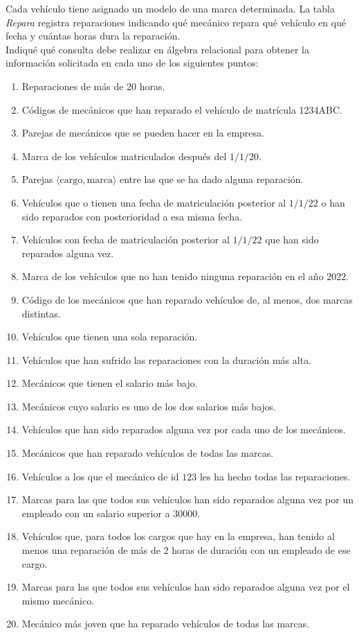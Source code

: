 \begin{ejercicio}
    Cada vehículo tiene asignado un modelo de una marca determinada. La tabla \emph{Repara} registra reparaciones indicando qué mecánico repara qué vehículo en qué fecha y cuántas horas dura la reparación.\\

    Indiqué qué consulta debe realizar en álgebra relacional para obtener la información solicitada en cada uno de los siguientes puntos:
    \begin{enumerate}
        \item Reparaciones de más de 20 horas.
        \item Códigos de mecánicos que han reparado el vehículo de matrícula 1234ABC.
        \item Parejas de mecánicos que se pueden hacer en la empresa.
        \item Marca de los vehículos matriculados después del $1/1/20$.
        \item Parejas $\langle \text{cargo}, \text{marca} \rangle$ entre las que se ha dado alguna reparación.
        \item Vehículos que o tienen una fecha de matriculación posterior al $1/1/22$ o han sido reparados con posterioridad a esa misma fecha.
        \item Vehículos con fecha de matriculación posterior al $1/1/22$ que han sido reparados alguna vez.
        \item Marca de los vehículos que no han tenido ninguna reparación en el año $2022$.
        \item Código de los mecánicos que han reparado vehículos de, al menos, dos marcas distintas.
        \item Vehículos que tienen una sola reparación.
        \item Vehículos que han sufrido las reparaciones con la duración más alta.
        \item Mecánicos que tienen el salario más bajo.
        \item Mecánicos cuyo salario es uno de los dos salarios más bajos.
        \item Vehículos que han sido reparados alguna vez por cada uno de los mecánicos.
        \item Mecánicos que han reparado vehículos de todas las marcas.
        \item Vehículos a los que el mecánico de id $123$ les ha hecho todas las reparaciones.
        \item Marcas para las que todos sus vehículos han sido reparados alguna vez por un empleado con un salario superior a $30000$.
        \item Vehículos que, para todos los cargos que hay en la empresa, han tenido al menos una reparación de más de $2$ horas de duración con un empleado de ese cargo.
        \item Marcas para las que todos sus vehículos han sido reparados alguna vez por el mismo mecánico.
        \item Mecánico más joven que ha reparado vehículos de todas las marcas.
    \end{enumerate}

\end{ejercicio}




